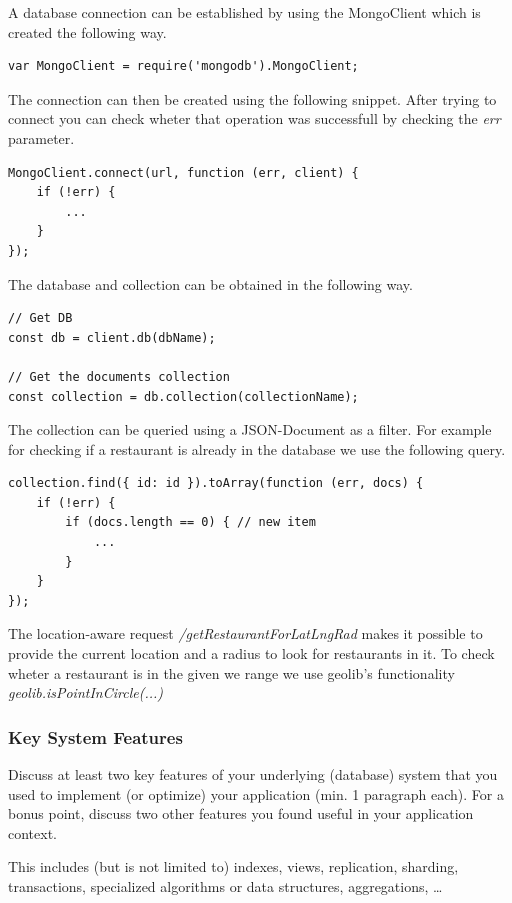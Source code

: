 A database connection can be established by using the MongoClient which is created the following way.
\begin{lstlisting}
var MongoClient = require('mongodb').MongoClient;
\end{lstlisting} 

The connection can then be created using the following snippet. After trying to connect you can check wheter that operation was successfull by checking the \textit{err} parameter.
\begin{lstlisting}
MongoClient.connect(url, function (err, client) {
	if (!err) {
		...
	}
});
\end{lstlisting}

The database and collection can be obtained in the following way.
\begin{lstlisting}
// Get DB
const db = client.db(dbName);

// Get the documents collection
const collection = db.collection(collectionName);
\end{lstlisting}

The collection can be queried using a JSON-Document as a filter. For example for checking if a restaurant is already in the database we use the following query.
\begin{lstlisting}
collection.find({ id: id }).toArray(function (err, docs) {
	if (!err) {
		if (docs.length == 0) { // new item
			...
		} 
	}
});
\end{lstlisting}

The location-aware request \textit{/getRestaurantForLatLngRad} makes it possible to provide the current location and a radius to look for restaurants in it. To check wheter a restaurant is in the given we range we use geolib's functionality \textit{geolib.isPointInCircle(...)}



\subsubsection{Key System Features}

Discuss at least two key features of your underlying (database) system that you
used to implement (or optimize) your application (min. 1 paragraph each). For
a bonus point, discuss two other features you found useful in your application
context.

This includes (but is not limited to) indexes, views, replication, sharding,
transactions, specialized algorithms or data structures, aggregations, \ldots

